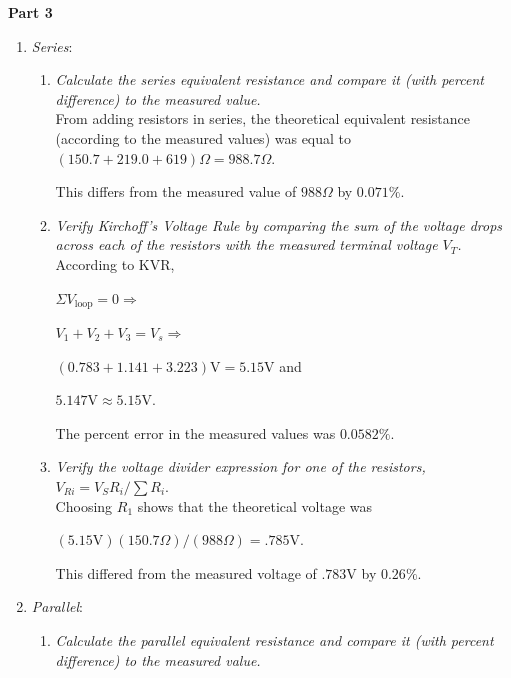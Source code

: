 \documentclass[twocolumn,english]{IEEEtran}
\theoremstyle{plain}
\theoremstyle{plain}
\begin{document}
\textbf{Part 3}
\begin{enumerate}
 \item \textit{Series}: \begin{enumerate}
               \item \textit{Calculate the series equivalent resistance and compare it (with percent difference) to the measured value.}\\

		  From adding resistors in series, the theoretical equivalent resistance (according to the measured values) was equal to $(150.7 + 219.0 + 619) \Omega = 988.7 \Omega$.

		  This differs from the measured value of $988 \Omega$ by $0.071\%$. \\
               \item \textit{Verify Kirchoff's Voltage Rule by comparing the sum of the voltage drops across each of the resistors with the measured terminal voltage $V_T$.}\\

		  According to KVR,

		  $\Sigma V_{\text{loop}} =0 \Rightarrow $

		  $V_1 + V_2 + V_3  = V_s\Rightarrow $

		  $(0.783+1.141+3.223)\text{V} = 5.15\text{V}$ and

		  $5.147\text{V} \approx 5.15\text{V}$.

		  The percent error in the measured values was $0.0582\%$. \\

               \item \textit{Verify the voltage divider expression for one of the resistors, $V_{Ri} = V_S R_i / \sum R_i$}.\\

               Choosing $R_1$ shows that the theoretical voltage was

               $(5.15\text{V})(150.7\Omega)/(988\Omega) = .785\text{V}$.

               This differed from the measured voltage of $.783$V by $0.26\%$. \\
              \end{enumerate}

  \item \textit{Parallel}: \begin{enumerate}
                   \item \textit{Calculate the parallel equivalent resistance and compare it (with percent difference) to the measured value.}\\


\end{enumerate}
\end{enumerate}
\end{document}
